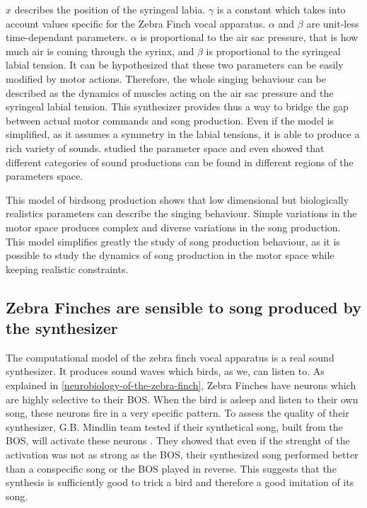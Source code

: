 \documentclass{report}
\begin{document}
\(x\) describes the position of the syringeal labia. \(\gamma\) is a constant
which takes into account values specific for the Zebra Finch vocal apparatus.
\(\alpha\) and \(\beta\) are unit-less time-dependant parameters. \(\alpha\) is
proportional to the air sac pressure, that is how much air is coming through the
syrinx, and \(\beta\) is proportional to the syringeal labial tension. It can be
hypothesized that these two parameters can be easily modified by motor actions.
Therefore, the whole singing behaviour can be described as the dynamics of
muscles acting on the air sac pressure and the syringeal labial tension. This
synthesizer provides thus a way to bridge the gap between actual motor commands
and song production. Even if the model is simplified, as it assumes a symmetry
in the labial tensions, it is able to produce a rich variety of sounds.
\textcite{amador_beyond_2008, perl_reconstruction_2011} studied the parameter
space and even showed that different categories of sound productions can be
found in different regions of the parameters space.

This model of birdsong production shows that low dimensional but biologically
realistics parameters can describe the singing behaviour. Simple variations in
the motor space produces complex and diverse variations in the song production.
This model simplifies greatly the study of song production behaviour, as it is
possible to study the dynamics of song production in the motor space while
keeping realistic constraints.

\subsection{Zebra Finches are sensible to song produced by the synthesizer}
\label{zebra-finches-are-sensible-to-song-produced-by-the-synthesizer}

The computational model of the zebra finch vocal apparatus is a real sound
synthesizer. It produces sound waves which birds, as we, can listen to. As
explained in \ref{neurobiology-of-the-zebra-finch}, Zebra Finches have neurons
which are highly selective to their BOS. When the bird is asleep and listen to
their own song, these neurons fire in a very specific pattern. To assess the
quality of their synthesizer, G.B. Mindlin team tested if their synthetical
song, built from the BOS, will activate these neurons
\parencite{amador_low_2014, boari_automatic_2015}. They showed that even if the
strenght of the activation was not as strong as the BOS, their synthesized song
performed better than a conspecific song or the BOS played in reverse. This
suggests that the synthesis is sufficiently good to trick a bird and therefore
a good imitation of its song.
\end{document}
